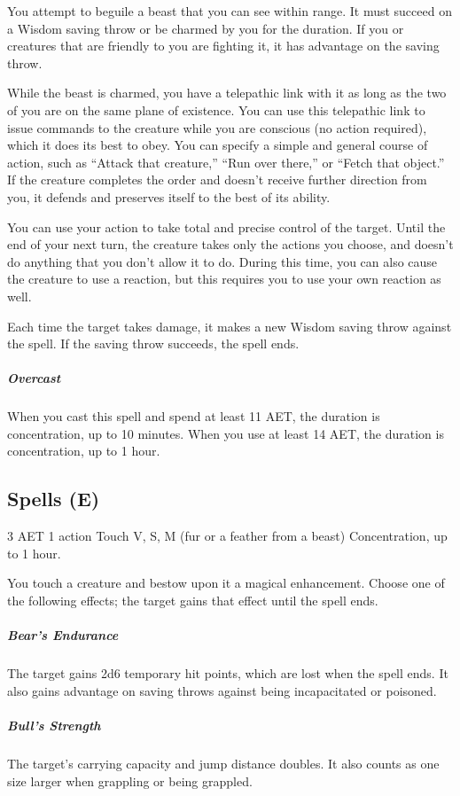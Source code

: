 You attempt to beguile a beast that you can see within range. It must succeed on a Wisdom saving throw or be charmed by you for the duration. If you or creatures that are friendly to you are fighting it, it has advantage on the saving throw.

While the beast is charmed, you have a telepathic link with it as long as the two of you are on the same plane of existence. You can use this telepathic link to issue commands to the creature while you are conscious (no action required), which it does its best to obey. You can specify a simple and general course of action, such as “Attack that creature,” “Run over there,” or “Fetch that object.” If the creature completes the order and doesn't receive further direction from you, it defends and preserves itself to the best of its ability.

You can use your action to take total and precise control of the target. Until the end of your next turn, the creature takes only the actions you choose, and doesn't do anything that you don't allow it to do. During this time, you can also cause the creature to use a reaction, but this requires you to use your own reaction as well.

Each time the target takes damage, it makes a new Wisdom saving throw against the spell. If the saving throw succeeds, the spell ends.

\subparagraph*{Overcast} When you cast this spell and spend at least 11 AET, the duration is concentration, up to 10 minutes. When you use at least 14 AET, the duration is concentration, up to 1 hour.

\subsection{Spells (E)}

{3 AET}
{1 action}
{Touch}
{V, S, M (fur or a feather from a beast)}
{Concentration, up to 1 hour.}

You touch a creature and bestow upon it a magical enhancement. Choose one of the following effects; the target gains that effect until the spell ends.

\subparagraph*{Bear's Endurance} The target gains 2d6 temporary hit points, which are lost when the spell ends. It also gains advantage on saving throws against being incapacitated or poisoned.

\subparagraph*{Bull's Strength} The target's carrying capacity and jump distance doubles. It also counts as one size larger when grappling or being grappled.

